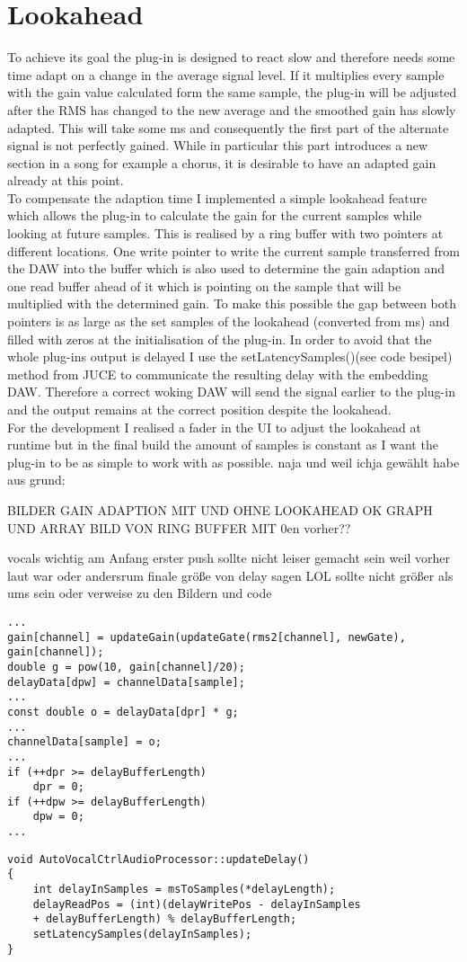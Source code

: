 \section{Lookahead}

To achieve its goal the plug-in is designed to react slow and therefore needs some time adapt on a change in the average signal level. If it multiplies every sample with the gain value calculated form the same sample, the plug-in will be adjusted after the RMS has changed to the new average and the smoothed gain has slowly adapted. This will take some ms and consequently the first part of the alternate signal is not perfectly gained. While in particular this part introduces a new section in a song for example a chorus, it is desirable to have an adapted gain already at this point.\\
To compensate the adaption time I implemented a simple lookahead feature which allows the plug-in to calculate the gain for the current samples while looking at future samples.  This is realised by a ring buffer with two pointers at different locations. One write pointer to write the current sample transferred from the DAW into the buffer which is also used to determine the gain adaption and one read buffer ahead of it which is pointing on the sample that will be multiplied with the determined gain. To make this possible the gap between both pointers is as large as the set samples of the lookahead (converted from ms) and filled with zeros at the initialisation of the plug-in. In order to avoid that the whole plug-ins output is delayed I use the setLatencySamples()(see code besipel) method from JUCE to  communicate the resulting delay with the embedding DAW. Therefore a correct woking DAW will send the signal earlier to the plug-in and the output remains at the correct position despite the lookahead.\\
For the development I realised a fader in the UI to adjust the lookahead at runtime but in the final build the amount of samples is constant as I want the plug-in to be as simple to work with as possible. naja und weil ichja gewählt habe aus grund:

BILDER GAIN ADAPTION MIT UND OHNE LOOKAHEAD OK GRAPH UND ARRAY BILD VON RING BUFFER MIT 0en vorher??

vocals wichtig am Anfang erster push sollte nicht leiser gemacht sein weil vorher laut war oder andersrum
finale größe von delay sagen LOL
sollte nicht größer als ums sein oder
verweise zu den Bildern und code

\begin{lstlisting}[frame=single]
...
gain[channel] = updateGain(updateGate(rms2[channel], newGate),
gain[channel]);
double g = pow(10, gain[channel]/20);
delayData[dpw] = channelData[sample];
...
const double o = delayData[dpr] * g;
...
channelData[sample] = o;
...
if (++dpr >= delayBufferLength)
	dpr = 0;
if (++dpw >= delayBufferLength)
	dpw = 0;
...
\end{lstlisting}

\begin{lstlisting}[frame=single]
void AutoVocalCtrlAudioProcessor::updateDelay()
{
    int delayInSamples = msToSamples(*delayLength);
    delayReadPos = (int)(delayWritePos - delayInSamples
    + delayBufferLength) % delayBufferLength;
    setLatencySamples(delayInSamples);
}
\end{lstlisting}